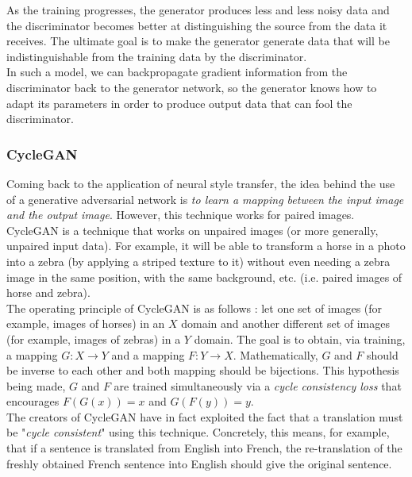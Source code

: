 \documentclass[twocolumn,superscriptaddress,aps]{revtex4-1}
\begin{document}
    As the training progresses, the generator produces less and less noisy data and the discriminator becomes better at distinguishing the source from the data it receives. The ultimate goal is to make the generator generate data that will be indistinguishable from the training data by the discriminator.\\
    
    In such a model, we can backpropagate gradient information from the discriminator back to the generator network, so the generator knows how to adapt its parameters in order to produce output data that can fool the discriminator.
    
    \subsubsection{CycleGAN}
    
    Coming back to the application of neural style transfer, the idea behind the use of a generative adversarial network is \emph{to learn a mapping between the input image and the output image}. However, this technique works for paired images. CycleGAN is a technique that works on unpaired images (or more generally, unpaired input data). For example, it will be able to transform a horse in a photo into a zebra (by applying a striped texture to it) without even needing a zebra image in the same position, with the same background, etc. (i.e. paired images of horse and zebra).\\
    
    The operating principle of CycleGAN is as follows : let one set of images (for example, images of horses) in an $X$ domain and another different set of images (for example, images of zebras) in a $Y$ domain. The goal is to obtain, via training, a mapping $G : X \rightarrow Y$ and a mapping $F : Y \rightarrow X$. Mathematically, $G$ and $F$ should be inverse to each other and both mapping should be bijections. This hypothesis being made, $G$ and $F$ are trained simultaneously via a \emph{cycle consistency loss} that encourages $F(G(x)) = x$ and $G(F(y)) = y$.\\
    
    The creators of CycleGAN have in fact exploited the fact that a translation must be "\emph{cycle consistent}" using this technique. Concretely, this means, for example, that if a sentence is translated from English into French, the re-translation of the freshly obtained French sentence into English should give the original sentence.\\
    
\end{document}
